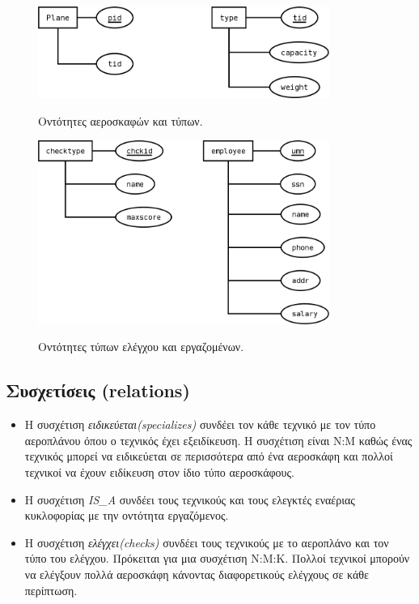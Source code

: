 \documentclass[a4paper]{article}
\begin{document}
\begin{figure}[h]
\centering
\includegraphics[width=0.85\textwidth]{../ER_model/aviation_entities_a.png}\\
\caption{Οντότητες αεροσκαφών και τύπων.}
\end{figure}
\begin{figure}[h]
\centering
\includegraphics[width=0.85\textwidth]{../ER_model/aviation_entities_b.png}\\
\caption{Οντότητες τύπων ελέγχου και εργαζομένων.}
\end{figure}

\pagebreak
\subsection{Συσχετίσεις (relations)}
\begin{itemize}
\item Η συσχέτιση \emph{ειδικεύεται(specializes)} συνδέει τον κάθε τεχνικό με τον τύπο
αεροπλάνου όπου ο τεχνικός έχει εξειδίκευση. Η συσχέτιση είναι Ν:Μ καθώς ένας
τεχνικός μπορεί να ειδικεύεται σε περισσότερα από ένα αεροσκάφη και πολλοί
τεχνικοί να έχουν ειδίκευση στον ίδιο τύπο αεροσκάφους.
\item Η συσχέτιση \emph{IS\_A} συνδέει τους τεχνικούς και τους ελεγκτές
εναέριας κυκλοφορίας με την οντότητα εργαζόμενος.
\item Η συσχέτιση \emph{ελέγχει(checks)} συνδέει τους τεχνικούς με το αεροπλάνο και τον τύπο
του ελέγχου. Πρόκειται για μια συσχέτιση Ν:Μ:Κ. Πολλοί τεχνικοί μπορούν να
ελέγξουν πολλά αεροσκάφη κάνοντας διαφορετικούς ελέγχους σε κάθε περίπτωση.
\end{itemize}
\end{document}
